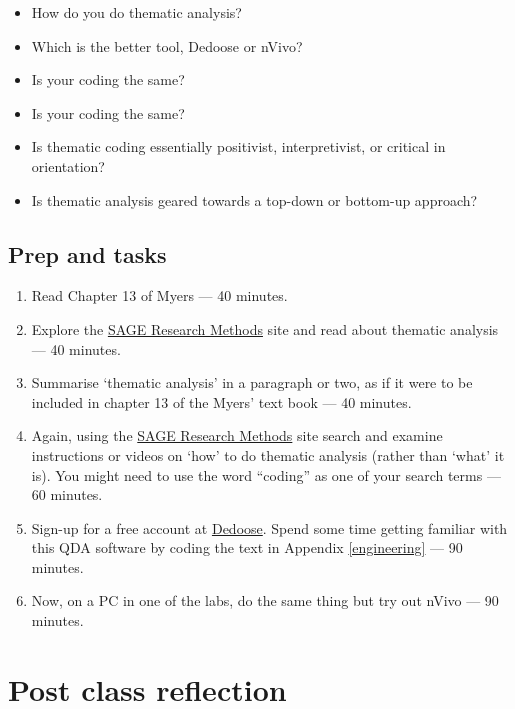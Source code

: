 \documentclass[]{book}
\theoremstyle{definition}
\theoremstyle{definition}
\theoremstyle{definition}
\theoremstyle{remark}
\begin{document}
\begin{itemize}
\item
  How do you do thematic analysis?
\item
  Which is the better tool, Dedoose or nVivo?
\item
  Is your coding the same?
\item
  Is your coding the same?
\item
  Is thematic coding essentially positivist, interpretivist, or critical
  in orientation?
\item
  Is thematic analysis geared towards a top-down or bottom-up approach?
\end{itemize}

\hypertarget{prep-and-tasks-5}{%
\subsection*{Prep and tasks}\label{prep-and-tasks-5}}

\begin{enumerate}
\def\labelenumi{\arabic{enumi}.}
\item
  Read Chapter 13 of Myers \autocite*[
  p.~165--181]{myers_2013_qualitativeresearchbusiness} --- 40 minutes.
\item
  Explore the
  \href{http://methods.sagepub.com.ezproxy.auckland.ac.nz/}{SAGE
  Research Methods} site and read about thematic analysis --- 40
  minutes.
\item
  Summarise `thematic analysis' in a paragraph or two, as if it were to
  be included in chapter 13 of the Myers' text book --- 40 minutes.
\item
  Again, using the
  \href{http://methods.sagepub.com.ezproxy.auckland.ac.nz/}{SAGE
  Research Methods} site search and examine instructions or videos on
  `how' to do thematic analysis (rather than `what' it is). You might
  need to use the word ``coding'' as one of your search terms --- 60
  minutes.
\item
  Sign-up for a free account at \href{http://dedoose.com}{Dedoose}.
  Spend some time getting familiar with this QDA software by coding the
  text in Appendix \ref{engineering} --- 90 minutes.
\item
  Now, on a PC in one of the labs, do the same thing but try out nVivo
  --- 90 minutes.
\end{enumerate}

\hypertarget{post-class-reflection-5}{%
\section*{Post class reflection}\label{post-class-reflection-5}}
\end{document}
